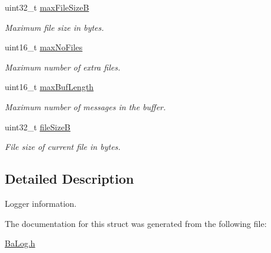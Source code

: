 \begin{DoxyCompactItemize}
\mbox{\label{structTBaLogInfo_aa3bf9b90409a8e9e83696ab940efd522}} 
uint32\+\_\+t \hyperlink{structTBaLogInfo_aa3bf9b90409a8e9e83696ab940efd522}{max\+File\+SizeB}
\begin{DoxyCompactList}\small\item\em Maximum file size in bytes. \end{DoxyCompactList}\item 
\mbox{\label{structTBaLogInfo_adbd1ecdf038ce3e82990c26e3f9810e2}} 
uint16\+\_\+t \hyperlink{structTBaLogInfo_adbd1ecdf038ce3e82990c26e3f9810e2}{max\+No\+Files}
\begin{DoxyCompactList}\small\item\em Maximum number of extra files. \end{DoxyCompactList}\item 
\mbox{\label{structTBaLogInfo_adc7f0a818941399d8b8e69aa005863ae}} 
uint16\+\_\+t \hyperlink{structTBaLogInfo_adc7f0a818941399d8b8e69aa005863ae}{max\+Buf\+Length}
\begin{DoxyCompactList}\small\item\em Maximum number of messages in the buffer. \end{DoxyCompactList}\item 
\mbox{\label{structTBaLogInfo_a16fdaba7033102060e6ceb3c4d8d70b6}} 
uint32\+\_\+t \hyperlink{structTBaLogInfo_a16fdaba7033102060e6ceb3c4d8d70b6}{file\+SizeB}
\begin{DoxyCompactList}\small\item\em File size of current file in bytes. \end{DoxyCompactList}\end{DoxyCompactItemize}


\subsection{Detailed Description}
Logger information. 

The documentation for this struct was generated from the following file\+:\begin{DoxyCompactItemize}
\item 
\hyperlink{BaLog_8h}{Ba\+Log.\+h}\end{DoxyCompactItemize}
